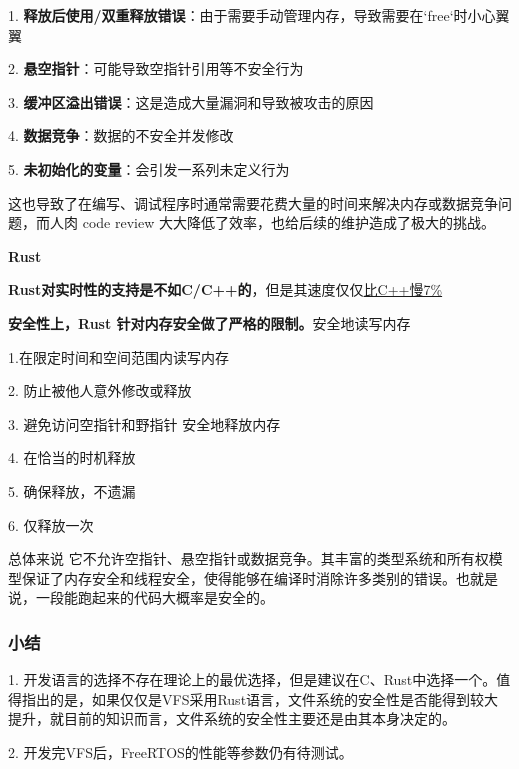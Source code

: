 \documentclass[UTF8,a4paper]{ctexart}
\begin{document}
	1.   \textbf{释放后使用/双重释放错误}：由于需要手动管理内存，导致需要在`free`时小心翼翼
	
	2. \textbf{悬空指针}：可能导致空指针引用等不安全行为
	
	3.  \textbf{缓冲区溢出错误}：这是造成大量漏洞和导致被攻击的原因
	
	4.  \textbf{数据竞争}：数据的不安全并发修改
	
	5.  \textbf{未初始化的变量}：会引发一系列未定义行为
	
	这也导致了在编写、调试程序时通常需要花费大量的时间来解决内存或数据竞争问题，而人肉 code review 大大降低了效率，也给后续的维护造成了极大的挑战。
	
	\textbf{Rust}
	
	\textbf{Rust对实时性的支持是不如C/C++的}，但是其速度仅仅\href{https://blog.famzah.net/2016/09/10/cpp-vs-python-vs-php-vs-java-vs-others-performance-benchmark-2016-q3/}{比C++慢7\%}
	
	\textbf{安全性上，Rust 针对内存安全做了严格的限制。}安全地读写内存 
	
	1.在限定时间和空间范围内读写内存
	
	2. 防止被他人意外修改或释放
	
	3. 避免访问空指针和野指针 安全地释放内存
	
	4. 在恰当的时机释放
	
	5. 确保释放，不遗漏
	
	6. 仅释放一次 
	
	总体来说 它不允许空指针、悬空指针或数据竞争。其丰富的类型系统和所有权模型保证了内存安全和线程安全，使得能够在编译时消除许多类别的错误。也就是说，一段能跑起来的代码大概率是安全的。
	\subsubsection{小结}
	1. 开发语言的选择不存在理论上的最优选择，但是建议在C、Rust中选择一个。值得指出的是，如果仅仅是VFS采用Rust语言，文件系统的安全性是否能得到较大提升，就目前的知识而言，文件系统的安全性主要还是由其本身决定的。
	
	2. 开发完VFS后，FreeRTOS的性能等参数仍有待测试。
\end{document}
